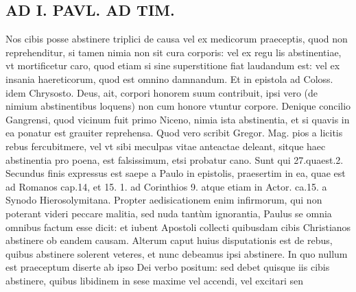 \documentclass{article}
\begin{document}
\begin{pages}
\section*{AD I. PAVL. AD TIM. }
\marginpar{[ p.310. ]}\pstart Nos cibis posse abstinere triplici de causa vel ex medicorum praeceptis, quod non reprehenditur, si tamen nimia non sit cura corporis: vel ex regu lis abstinentiae, vt mortificetur caro, quod etiam si sine superstitione fiat laudandum est: vel ex insania haereticorum, quod est omnino damnandum. Et in epistola ad Coloss. idem Chrysosto. Deus, ait, corpori honorem suum contribuit, ipsi vero (de nimium abstinentibus loquens) non cum honore vtuntur corpore. Denique concilio Gangrensi, quod vicinum fuit primo Niceno, nimia ista abstinentia, et si quavis in ea ponatur est grauiter reprehensa. Quod vero scribit Gregor. Mag. pios a licitis rebus fercubitmere, vel vt sibi meculpas vitae anteactae deleant, sitque haec abstinentia pro poena, est falsissimum, etsi probatur cano. Sunt qui 27.quaest.2.  \pend\pstart Secundus finis expressus est saepe a Paulo in epistolis, praesertim in ea, quae est ad Romanos cap.14, et 15. 1. ad Corinthios 9. atque etiam in Actor. ca.15. a Synodo Hierosolymitana. Propter aedisicationem enim infirmorum, qui non poterant videri peccare malitia, sed nuda tantùm ignorantia, Paulus se omnia omnibus factum esse dicit: et iubent Apostoli collecti quibusdam cibis Christianos abstinere ob eandem causam.  \pend\pstart Alterum caput huius disputationis est de rebus, quibus abstinere solerent veteres, et nunc debeamus ipsi abstinere. In quo nullum est praeceptum diserte ab ipso Dei verbo positum: sed debet quisque iis cibis abstinere, quibus libidinem in sese maxime vel accendi, vel excitari sen\pend

\end{pages}
\end{document}
